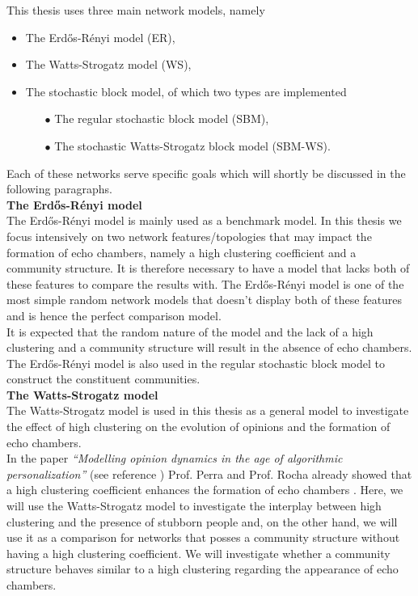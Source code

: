\documentclass[11 pt , letterpaper , twoside , openright]{book}
\begin{document}
This thesis uses three main network models, namely
\begin{itemize}
	\item The Erd\H{o}s-R\'{e}nyi model (ER),
	\item The Watts-Strogatz model (WS),
	\item The stochastic block model, of which two types are implemented
		\begin{itemize}
			\item[\tiny$\bullet$] The regular stochastic block model (SBM),
			\item[\tiny$\bullet$] The stochastic Watts-Strogatz block model (SBM-WS).
		\end{itemize}
\end{itemize}
Each of these networks serve specific goals which will shortly be discussed in the following paragraphs.\\
\newline
\textbf{The Erd\H{o}s-R\'{e}nyi model}\\
\newline
The Erd\H{o}s-R\'{e}nyi model is mainly used as a benchmark model. In this thesis we focus intensively on two network features/topologies that may impact the formation of echo chambers, namely a high clustering coefficient and a community structure. It is therefore necessary to have a model that lacks both of these features to compare the results with. The Erd\H{o}s-R\'{e}nyi model is one of the most simple random network models that doesn't display both of these features and is hence the perfect comparison model. \\
It is expected that the random nature of the model and the lack of a high clustering and a community structure will result in the absence of echo chambers.\\
The Erd\H{o}s-R\'{e}nyi model is also used in the regular stochastic block model to construct the constituent communities.\\
\newline
\textbf{The Watts-Strogatz model}\\
\newline
The Watts-Strogatz model is used in this thesis as a general model to investigate the effect of high clustering on the evolution of opinions and the formation of echo chambers.\\
In the paper \textit{``Modelling opinion dynamics in the age of algorithmic personalization''} (see reference \cite{Perra2019}) Prof. Perra and Prof. Rocha already showed that a high clustering coefficient enhances the formation of echo chambers \cite{Perra2019}. Here, we will use the Watts-Strogatz model to investigate the interplay between high clustering and the presence of stubborn people and, on the other hand, we will use it as a comparison for networks that posses a community structure without having a high clustering coefficient. We will investigate whether a community structure behaves similar to a high clustering regarding the appearance of echo chambers.\\
\end{document}
